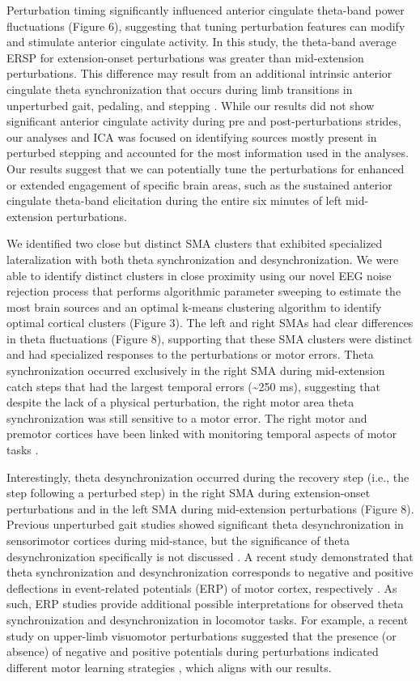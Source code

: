 \documentclass[shortpaper,twoside,web]{ieeecolor}
\newcommand{\td}{\textasciitilde}
\begin{document}
Perturbation timing significantly influenced anterior cingulate theta-band power fluctuations (Figure 6), suggesting that tuning perturbation features can modify and stimulate anterior cingulate activity. In this study, the theta-band average ERSP for extension-onset perturbations was greater than mid-extension perturbations. This difference may result from an additional intrinsic anterior cingulate theta synchronization that occurs during limb transitions in unperturbed gait, pedaling, and stepping \cite{Gramann2011-yj,Bulea2015-dv,Kline2014-pt,Enders2016-id}. While our results did not show significant anterior cingulate activity during pre and post-perturbations strides, our analyses and ICA was focused on identifying sources mostly present in perturbed stepping and accounted for the most information used in the analyses. Our results suggest that we can potentially tune the perturbations for enhanced or extended engagement of specific brain areas, such as the sustained anterior cingulate theta-band elicitation during the entire six minutes of left mid-extension perturbations.

We identified two close but distinct SMA clusters that exhibited specialized lateralization with both theta synchronization and desynchronization. We were able to identify distinct clusters in close proximity using our novel EEG noise rejection process that performs algorithmic parameter sweeping to estimate the most brain sources and an optimal k-means clustering algorithm to identify optimal cortical clusters (Figure 3). The left and right SMAs had clear differences in theta fluctuations (Figure 8), supporting that these SMA clusters were distinct and had specialized responses to the perturbations or motor errors. Theta synchronization occurred exclusively in the right SMA during mid-extension catch steps that had the largest temporal errors (\td250 ms), suggesting that despite the lack of a physical perturbation, the right motor area theta synchronization was still sensitive to a motor error. The right motor and premotor cortices have been linked with monitoring temporal aspects of motor tasks \cite{Mutha2014-ea,Wagner2016-nx}.

Interestingly, theta desynchronization occurred during the recovery step (i.e., the step following a perturbed step) in the right SMA during extension-onset perturbations and in the left SMA during mid-extension perturbations (Figure 8). Previous unperturbed gait studies showed significant theta desynchronization in sensorimotor cortices during mid-stance, but the significance of theta desynchronization specifically is not discussed \cite{Gramann2011-yj,Bradford2016-kp,Enders2016-id,Kline2016-ci}. A recent study demonstrated that theta synchronization and desynchronization corresponds to negative and positive deflections in event-related potentials (ERP) of motor cortex, respectively \cite{Nakagome2020-iv}. As such, ERP studies provide additional possible interpretations for observed theta synchronization and desynchronization in locomotor tasks. For example, a recent study on upper-limb visuomotor perturbations suggested that the presence (or absence) of negative and positive potentials during perturbations indicated different motor learning strategies \cite{Palidis2019-kg}, which aligns with our results.
\end{document}
